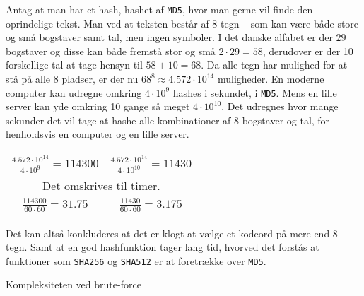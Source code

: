 \documentclass[a4paper, 12pt]{article}
\begin{document}
    \begin{eks}[h]
        Antag at man har et hash, hashet af \texttt{MD5}, hvor man gerne vil finde den oprindelige tekst.
        Man ved at teksten består af 8 tegn -- som kan være både store og små bogstaver samt tal, men ingen symboler.
        I det danske alfabet er der \(29\) bogstaver og disse kan både fremstå stor og små \(2\cdot29=58\), derudover er der 10 forskellige tal at tage hensyn til \(58+10=68\).
        Da alle tegn har mulighed for at stå på alle 8 pladser, er der nu \(68^8\approx4.572\cdot10^{14}\) muligheder.
        En moderne computer kan udregne omkring \(4\cdot10^9\) hashes i sekundet, i \texttt{MD5}.
        Mens en lille server kan yde omkring 10 gange så meget \(4\cdot10^{10}\).\footnotemark
        Det udregnes hvor mange sekunder det vil tage at hashe alle kombinationer af 8 bogstaver og tal, for henholdsvis en computer og en lille server.

        \begin{center}
            \begin{tabular}{c c}

                \(\frac{4.572\cdot10^{14}}{4\cdot10^9} = 114300\) &
                \(\frac{4.572\cdot10^{14}}{4\cdot10^{10}} = 11430\)\\

                \multicolumn{2}{c}{Det omskrives til timer.}\\

                \(\frac{114300}{60\cdot60} = 31.75\) &
                \(\frac{11430}{60\cdot60} = 3.175\)\\

            \end{tabular}
        \end{center}


        Det kan altså konkluderes at det er klogt at vælge et kodeord på mere end 8 tegn.
        Samt at en god hashfunktion tager lang tid, hvorved det forstås at funktioner som \texttt{SHA256} og \texttt{SHA512} er at foretrække over \texttt{MD5}.


        \caption{Kompleksiteten ved brute-force}
        \label{eks:bruteforce}

    \end{eks}
\end{document}
